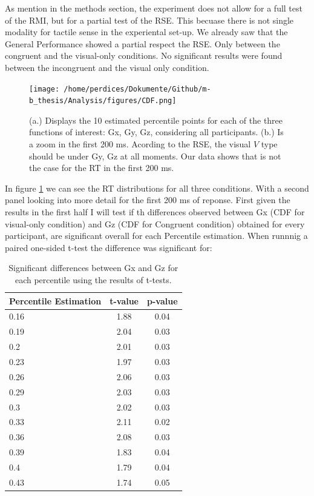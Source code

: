 \documentclass[12pt,oneside,openright]{report}
\begin{document}
As mention in the methods section, the experiment does not allow for a full test of the RMI, but for a partial test of the RSE. This becuase there is not single modality for tactile sense in the experiental set-up. We already saw that the General Performance showed a partial respect the RSE. Only between the congruent and the visual-only conditions. No significant results were found between the incongruent and the visual only condition. 

\begin{figure}[!ht]
    \centering
    \texttt{[image: /home/perdices/Dokumente/Github/m-b\_thesis/Analysis/figures/CDF.png]}
    \caption{ (a.) Displays the 10 estimated percentile points for each of the three functions of interest: Gx, Gy, Gz, considering all participants. (b.) Is a zoom in the first 200 ms. Acording to the RSE, the visual $V$ type should be under Gy, Gz at all moments. Our data shows that is not the case for the RT in the first 200 ms.}
    \label{fig:CDF}
\end{figure}

In figure \ref{fig:CDF} we can see the RT distributions for all three conditions. With a second panel looking into more detail for the first 200 ms of reponse. First given the results in the first half I will test if th differences observed between Gx (CDF for visual-only condition) and Gz (CDF for Congruent condition) obtained for every participant, are significant overall for each Percentile estimation. When runnnig a paired one-sided t-test the difference  was significant for:


\begin{table}[!ht]
        \centering
        \begin{tabular}{lcc}
        \hline
        \textbf{Percentile Estimation} & \textbf{t-value} & \textbf{p-value} \\ \hline \hline
        0.16  & 1.88  & 0.04 \\
        0.19  & 2.04  & 0.03 \\
        0.2   & 2.01  & 0.03 \\
        0.23  & 1.97  & 0.03 \\
        0.26  & 2.06  & 0.03 \\
        0.29  & 2.03  & 0.03 \\
        0.3   & 2.02  & 0.03 \\
        0.33  & 2.11  & 0.02 \\
        0.36  & 2.08  & 0.03 \\
        0.39  & 1.83  & 0.04 \\
        0.4   & 1.79  & 0.04 \\
        0.43  & 1.74  & 0.05 \\
        \hline
        \end{tabular}
        \caption{Significant differences between Gx and Gz for each percentile using the results of t-tests.}
        \label{tab:significant-results}
\end{table}
    
\end{document}
